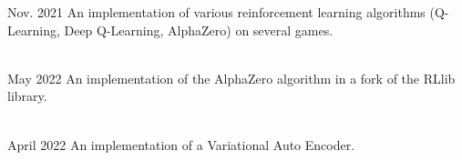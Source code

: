 \documentclass[10pt,a4paper,ragged2e,withhyper]{altacv}
\begin{document}
\begin{paracol}{2}
            {Nov. 2021}{}
            An implementation of various reinforcement learning algorithms
            (Q-Learning, Deep Q-Learning, AlphaZero)
            on several games.\\
            \vspace{4pt}
            \\
            \vspace{4pt}
            \divider

            {May 2022}{}
            An implementation of the AlphaZero algorithm in a fork of the RLlib library.\\
            \vspace{4pt}
            \\
            \vspace{4pt}
            \divider
            
            {April 2022}{}
            An implementation of a Variational Auto Encoder.\\
            \vspace{4pt}
            \\
            \vspace{4pt}
        
    \end{paracol}
\end{document}
